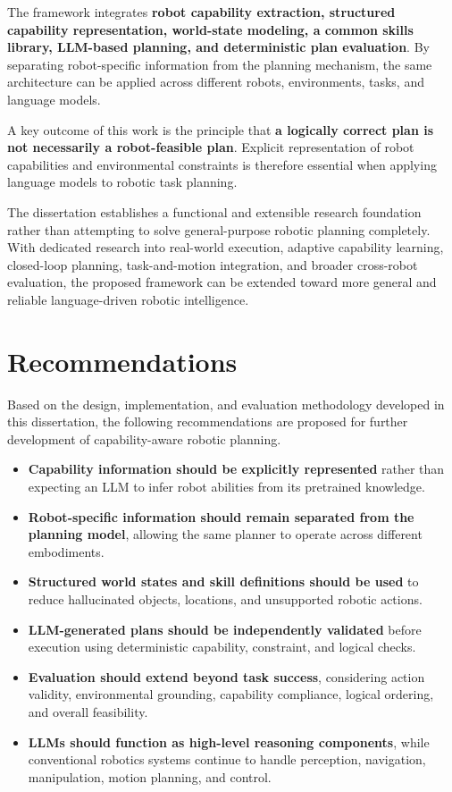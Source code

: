 \documentclass[12pt,a4paper]{article}
\begin{document}
The framework integrates \textbf{robot capability extraction, structured capability representation, world-state modeling, a common skills library, LLM-based planning, and deterministic plan evaluation}.
By separating robot-specific information from the planning mechanism, the same architecture can be applied across different robots, environments, tasks, and language models.

A key outcome of this work is the principle that \textbf{a logically correct plan is not necessarily a robot-feasible plan}.
Explicit representation of robot capabilities and environmental constraints is therefore essential when applying language models to robotic task planning.

The dissertation establishes a functional and extensible research foundation rather than attempting to solve general-purpose robotic planning completely.
With dedicated research into real-world execution, adaptive capability learning, closed-loop planning, task-and-motion integration, and broader cross-robot evaluation, the proposed framework can be extended toward more general and reliable language-driven robotic intelligence.

\section{Recommendations}

Based on the design, implementation, and evaluation methodology developed in this dissertation, the following recommendations are proposed for further development of capability-aware robotic planning.

\begin{itemize}
  \item \textbf{Capability information should be explicitly represented} rather than expecting an LLM to infer robot abilities from its pretrained knowledge.
  \item \textbf{Robot-specific information should remain separated from the planning model}, allowing the same planner to operate across different embodiments.
  \item \textbf{Structured world states and skill definitions should be used} to reduce hallucinated objects, locations, and unsupported robotic actions.
  \item \textbf{LLM-generated plans should be independently validated} before execution using deterministic capability, constraint, and logical checks.
  \item \textbf{Evaluation should extend beyond task success}, considering action validity, environmental grounding, capability compliance, logical ordering, and overall feasibility.
  \item \textbf{LLMs should function as high-level reasoning components}, while conventional robotics systems continue to handle perception, navigation, manipulation, motion planning, and control.
\end{itemize}
\end{document}
